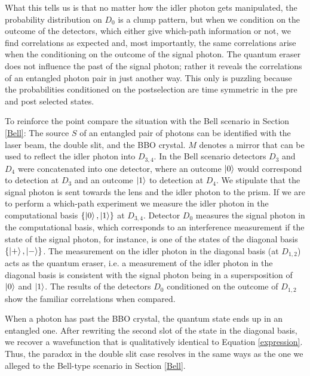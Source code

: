 \documentclass[11pt]{article}
\numberwithin{equation}{section}
\begin{document}
What this tells us is that no matter how the idler photon gets manipulated, the probability distribution on $D_0$ is a clump pattern, but when we condition on the outcome of the detectors, which either give which-path information or not, we find correlations as expected and, most importantly, the same correlations arise when the conditioning on the outcome of the signal photon. The quantum eraser does not influence the past of the signal photon; rather it reveals the correlations of an entangled photon pair in just another way. This only is puzzling because the probabilities conditioned on the postselection are time symmetric in the pre and post selected states. 

To reinforce the point compare the situation with the Bell scenario in Section \ref{Bell}: The source $S$ of an entangled pair of photons can be identified with the laser beam, the double slit, and the BBO crystal. $M$ denotes a mirror that can be used to reflect the idler photon into $D_{3,4}$. In the Bell scenario detectors $D_3$ and $D_4$ were concatenated into one detector, where an outcome $\ket{0}$ would correspond to detection at $D_3$ and an outcome $\ket{1}$ to detection at $D_4$. We stipulate that the signal photon is sent towards the lens and the idler photon to the prism. If we are to perform a which-path experiment we measure the idler photon in the computational basis $\{\ket{0},\ket{1}\}$ at $D_{3,4}$. Detector $D_0$ measures the signal photon in the computational basis, which corresponds to an interference measurement if the state of the signal photon, for instance, is one of the states of the diagonal basis $\{\ket{+},\ket{-}\}$. The measurement on the idler photon in the diagonal basis (at $D_{1,2}$) acts as the quantum eraser, i.e. a measurement of the idler photon in the diagonal basis is consistent with the signal photon being in a supersposition of $\ket{0}$ and $\ket{1}$. The results of the detectors $D_0$ conditioned on the outcome of $D_{1,2}$ show the familiar correlations when compared. 

When a photon has past the BBO crystal, the quantum state ends up in an entangled one. After rewriting the second slot of the state in the diagonal basis, we recover a wavefunction that is qualitatively identical to Equation \ref{expression}. Thus, the paradox in the double slit case resolves in the same ways as the one we alleged to the Bell-type scenario in Section \ref{Bell}.

\end{document}

